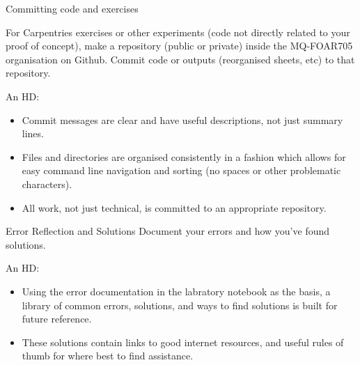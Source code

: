 \documentclass[aspectratio=43, 11pt]{beamer} %
\begin{document}
\begin{frame}{Committing code and exercises}

For Carpentries exercises or other experiments (code not directly related to your proof of concept), make a repository (public or private) inside the MQ-FOAR705 organisation on Github. Commit code or outputs (reorganised sheets, etc) to that repository.

An HD:
\begin{itemize}[label=\textbullet]
\item Commit messages are clear and have useful descriptions, not just summary lines. 
\item Files and directories are organised consistently in a fashion which allows for easy command line navigation and sorting (no spaces or other problematic characters). 
\item All work, not just technical, is committed to an appropriate repository. 
\end{itemize}



\end{frame}
\begin{frame}{Error Reflection and Solutions}
Document your errors and how you've found solutions. 

An HD:
\begin{itemize}[label=\textbullet]
\item Using the error documentation in the labratory notebook as the basis, a library of common errors, solutions, and ways to find solutions is built for future reference. 
\item These solutions contain links to good internet resources, and useful rules of thumb for where best to find assistance.
\end{itemize}
\end{frame}
\end{document}
